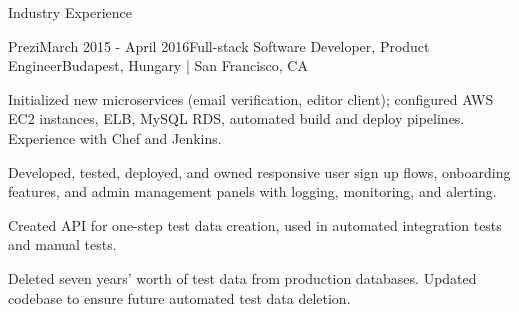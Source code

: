 \documentclass{resume} %
\begin{document}
\begin{rSection}{Industry Experience}

%
%


\begin{rSubsection}{Prezi}{March 2015 - April 2016}{Full-stack Software Developer, Product Engineer}{Budapest, Hungary | San Francisco, CA}
\item Initialized new microservices (email verification, editor client); configured AWS EC2 instances, ELB, MySQL RDS, automated build and deploy pipelines. Experience with Chef and Jenkins.
\item Developed, tested, deployed, and owned responsive user sign up flows, onboarding features, and admin management panels with logging, monitoring, and alerting.
\item Created API for one-step test data creation, used in automated integration tests and manual tests.
\item Deleted seven years' worth of test data from production databases. Updated codebase to ensure future automated test data deletion.


\end{rSubsection}



\end{rSection}
\end{document}
